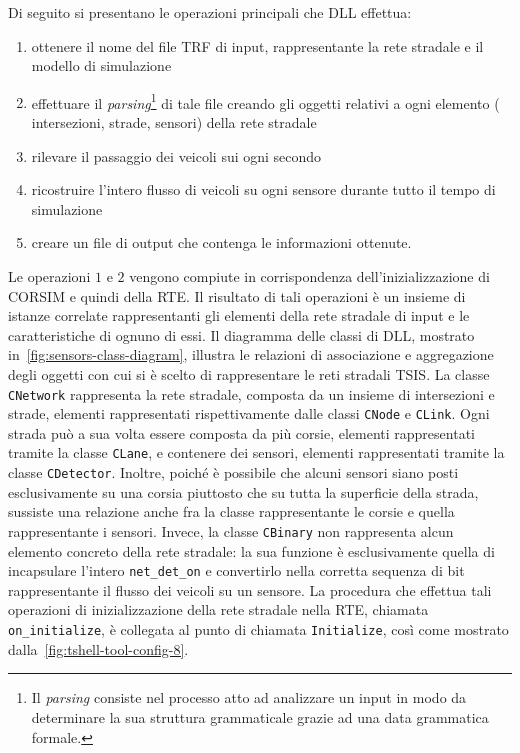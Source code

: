 Di seguito si presentano le operazioni principali che  \acs{DLL} effettua:
\begin{enumerate}
    \item ottenere il nome del file \acs{TRF} di input, rappresentante la rete stradale e il modello di simulazione
    \item effettuare il \emph{parsing}\footnote{Il \emph{parsing} consiste nel processo atto ad analizzare un input in modo da determinare la sua struttura grammaticale grazie ad una data grammatica formale.} di tale file creando gli oggetti relativi a ogni elemento (\eg{} intersezioni, strade, sensori) della rete stradale
    \item rilevare il passaggio dei veicoli sui  ogni secondo
    \item ricostruire l'intero flusso di veicoli su ogni sensore durante tutto il tempo di simulazione
    \item creare un file di output che contenga le informazioni ottenute.
\end{enumerate}
Le operazioni $1$ e $2$ vengono compiute in corrispondenza dell'inizializzazione di \acs{CORSIM} e quindi della \acs{RTE}. Il risultato di tali operazioni è un insieme di istanze correlate rappresentanti gli elementi della rete stradale di input e le caratteristiche di ognuno di essi. Il diagramma delle classi di  \acs{DLL}, mostrato in~\vref{fig:sensors-class-diagram}, illustra le relazioni di associazione e aggregazione degli oggetti con cui si è scelto di rappresentare le reti stradali \acs{TSIS}. La classe \lstinline[]|CNetwork| rappresenta la rete stradale, composta da un insieme di intersezioni e strade, elementi rappresentati rispettivamente dalle classi \lstinline[]|CNode| e \lstinline[]|CLink|. Ogni strada può a sua volta essere composta da più corsie, elementi rappresentati tramite la classe \lstinline[]|CLane|, e contenere dei sensori, elementi rappresentati tramite la classe \lstinline[]|CDetector|. Inoltre, poiché è possibile che alcuni sensori siano posti esclusivamente su una corsia piuttosto che su tutta la superficie della strada, sussiste una relazione anche fra la classe rappresentante le corsie e quella rappresentante i sensori. Invece, la classe \lstinline[]|CBinary| non rappresenta alcun elemento concreto della rete stradale: la sua funzione è esclusivamente quella di incapsulare l'intero \lstinline[]|net_det_on| e convertirlo nella corretta sequenza di bit rappresentante il flusso dei veicoli su un sensore. La procedura che effettua tali operazioni di inizializzazione della rete stradale nella \acs{RTE}, chiamata \lstinline[]|on_initialize|, è collegata al punto di chiamata \lstinline[]|Initialize|, così come mostrato dalla~\vref{fig:tshell-tool-config-8}.

